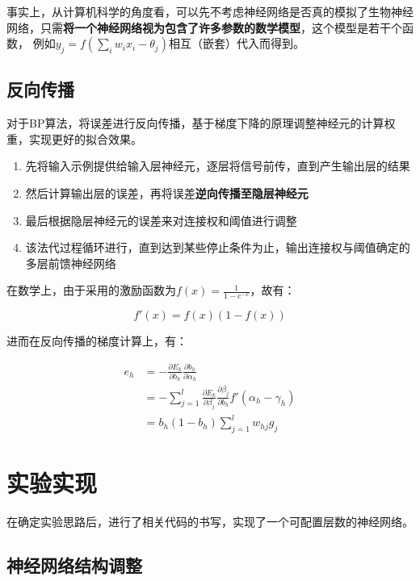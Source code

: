 \documentclass[12pt,a4paper]{article}
\begin{document}
事实上，从计算机科学的角度看，可以先不考虑神经网络是否真的模拟了生物神经网络，只需\textbf{将一个神经网络视为包含了许多参数的数学模型}，这个模型是若干个函数，
例如$y_j=f(\sum_i w_i x_i -\theta_j)$相互（嵌套）代入而得到。

\subsection{反向传播}

对于BP算法，将误差进行反向传播，基于梯度下降的原理调整神经元的计算权重，实现更好的拟合效果。

\begin{enumerate}
\item
  先将输入示例提供给输入层神经元，逐层将信号前传，直到产生输出层的结果
\item
  然后计算输出层的误差，再将误差\textbf{逆向传播至隐层神经元}
\item
  最后根据隐层神经元的误差来对连接权和阈值进行调整
\item
  该法代过程循环进行，直到达到某些停止条件为止，输出连接权与阈值确定的多层前馈神经网络
\end{enumerate}

在数学上，由于采用的激励函数为$f(x) = \frac{1}{1 - e^{-x}}$，故有：

$$
f'(x) = f(x) (1 - f(x))
$$

进而在反向传播的梯度计算上，有：

\begin{equation}
\begin{aligned}
e_h &= - \frac{\partial E_k}{\partial b_h} \frac{\partial b_h}{\partial \alpha_h} \\
&= - \sum_{j = 1}^{l} \frac{\partial E_k}{\partial \beta_j} \frac{\partial \beta_j}{\partial b_h} f'(\alpha_h - \gamma_h) \\
&= b_h(1 - b_h) \sum_{j = 1}^{l} w_{hj} g_j 
\end{aligned}
\end{equation}


\section{实验实现}

在确定实验思路后，进行了相关代码的书写，实现了一个可配置层数的神经网络。

\subsection{神经网络结构调整}
\end{document}
